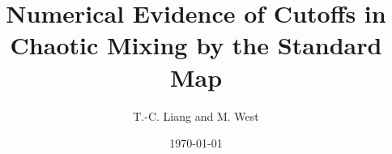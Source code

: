 \documentclass{article}
\title{Numerical Evidence of Cutoffs in Chaotic Mixing by the Standard Map}
\author{T.-C. Liang and M. West}
\date{\today}
\begin{document}
\maketitle
\begin{abstract}

\end{abstract}












 

\end{document}
